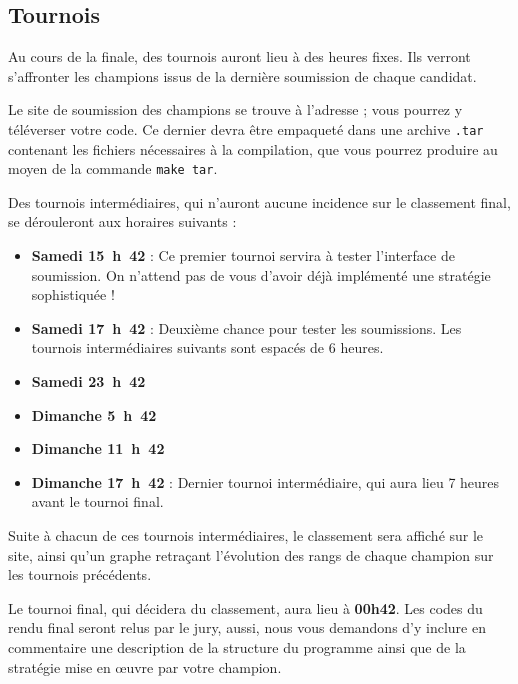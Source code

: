 \subsection{Tournois}

Au cours de la finale, des tournois auront lieu à des heures
fixes. Ils verront s'affronter les champions issus de la dernière
soumission de chaque candidat.

Le site de soumission des champions se trouve à l'adresse
\href{http://concours/} ; vous pourrez y téléverser votre code. Ce
dernier devra être empaqueté dans une archive \texttt{.tar} contenant
les fichiers nécessaires à la compilation, que vous pourrez produire
au moyen de la commande \texttt{make tar}.

Des tournois intermédiaires, qui n'auront aucune incidence sur le
classement final, se dérouleront aux horaires suivants :
\begin{itemize}
\item \textbf{Samedi 15~h~42} : Ce premier tournoi servira à tester
  l'interface de soumission. On n'attend pas de vous d'avoir déjà
  implémenté une stratégie sophistiquée !
\item \textbf{Samedi 17~h~42} : Deuxième chance pour tester les
  soumissions. Les tournois intermédiaires suivants sont espacés de 6
  heures.
\item \textbf{Samedi 23~h~42}
\item \textbf{Dimanche 5~h~42}
\item \textbf{Dimanche 11~h~42}
\item \textbf{Dimanche 17~h~42} : Dernier tournoi intermédiaire, qui
  aura lieu 7 heures avant le tournoi final.
\end{itemize}

Suite à chacun de ces tournois intermédiaires, le classement sera
affiché sur le site, ainsi qu'un graphe retraçant l'évolution des
rangs de chaque champion sur les tournois précédents.

Le tournoi final, qui décidera du classement, aura lieu à
\textbf{00h42}. Les codes du rendu final seront relus par le jury,
aussi, nous vous demandons d'y inclure en commentaire une description
de la structure du programme ainsi que de la stratégie mise en œuvre
par votre champion.

